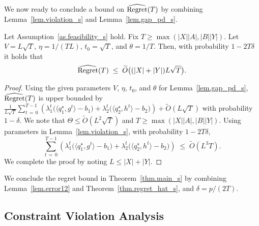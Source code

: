 \documentclass[12pt, final]{l4dc2023}
\begin{document}
We now ready to conclude a bound on ${\hat{\text{\normalfont Regret}}(T)}$ by combining Lemma~\ref{lem.violation_s} and Lemma~\ref{lem.gap_pd_s}.
\begin{theorem}\label{thm.regret_hat_s}
	Let Assumption~\ref{as.feasibility_s} hold. Fix $T\geq \max(|X||A|,|B||Y|)$. Let $V=L\sqrt{T}$, $\eta = 1/(TL)$, $t_0=\sqrt{T}$, and $\theta = 1/T$. Then,
	with probability $1-2T\delta$ it holds that
	\[
	{\hat{\text{\normalfont Regret}}(T)}\;\leq\;
	\tilde O \big({(|X|+|Y|) L \sqrt T}\big).
	\]
\end{theorem}
\begin{proof} 
	Using the given parameters $V$, $\eta$, $t_0$, and $\theta$ for Lemma~\ref{lem.gap_pd_s}, ${\hat{\text{\normalfont Regret}}(T)}$ is upper bounded by 
	$\frac{1}{L\sqrt{T}}
	\sum_{t\,=\,0}^{T-1}
	\left(
	\lambda_1^{t} \big(\langle{ q_1^\star},{g^{t}}\rangle  -b_1\big)
	+
	\lambda_2^{t} \big( \langle{ q_2^\star},{h^{t}}\rangle -b_2\big)
	\right)
	+ \tilde O(L\sqrt{T })$
	with probability $1-\delta$.
	We note that $\Theta\leq	\tilde O(L^2\sqrt{T})$ and $T\geq \max(|X||A|,|B||Y|)$.	
	Using parameters in Lemma~\ref{lem.violation_s}, with probability $1-2T\delta$,
	\[
	\sum_{t\,=\,0}^{T-1}
	\left(
	\lambda_1^{t} \big(\langle{ q_1^\star},{g^{t}}\rangle - b_1\big)
	+
	\lambda_2^{t} \big( \langle{ q_2^\star},{h^{t}}\rangle - b_2\big)
	\right)
	\;\leq\; \tilde O(L^3 T).
	\] 
	We complete the proof by noting $L\leq |X|+|Y|$. 
\end{proof}

We conclude the regret bound in Theorem~\ref{thm.main_s} by combining Lemma~\ref{lem.error12} and Theorem~\ref{thm.regret_hat_s}, and $\delta=p/(2T)$.

\subsection{Constraint Violation Analysis}
\end{document}
